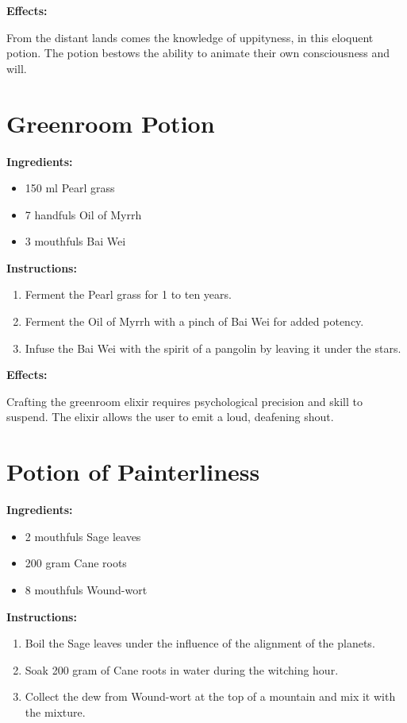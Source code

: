 \documentclass{article}
\begin{document}
\textbf{Effects:}

From the distant lands comes the knowledge of uppityness, in this eloquent potion. The potion bestows the ability to animate their own consciousness and will.

\newpage
\section*{Greenroom Potion}

\textbf{Ingredients:}

\begin{itemize}
  \item 150 ml Pearl grass
  \item 7 handfuls Oil of Myrrh
  \item 3 mouthfuls Bai Wei
\end{itemize}

\textbf{Instructions:}

\begin{enumerate}
  \item Ferment the Pearl grass for 1 to ten years.
  \item Ferment the Oil of Myrrh with a pinch of Bai Wei for added potency.
  \item Infuse the Bai Wei with the spirit of a pangolin by leaving it under the stars.
\end{enumerate}

\textbf{Effects:}

Crafting the greenroom elixir requires psychological precision and skill to suspend. The elixir allows the user to emit a loud, deafening shout.

\newpage
\section*{Potion of Painterliness}

\textbf{Ingredients:}

\begin{itemize}
  \item 2 mouthfuls Sage leaves
  \item 200 gram Cane roots
  \item 8 mouthfuls Wound-wort
\end{itemize}

\textbf{Instructions:}

\begin{enumerate}
  \item Boil the Sage leaves under the influence of the alignment of the planets.
  \item Soak 200 gram of Cane roots in water during the witching hour.
  \item Collect the dew from Wound-wort at the top of a mountain and mix it with the mixture.
\end{enumerate}
\end{document}

